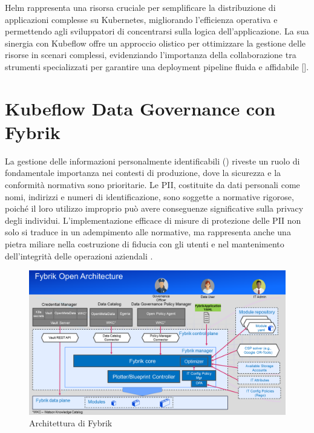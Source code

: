 Helm rappresenta una risorsa cruciale per semplificare la distribuzione di applicazioni complesse su Kubernetes, migliorando l'efficienza operativa e permettendo agli sviluppatori di concentrarsi sulla logica dell'applicazione. La sua sinergia con Kubeflow offre un approccio olistico per ottimizzare la gestione delle risorse in scenari complessi, evidenziando l'importanza della collaborazione tra strumenti specializzati per garantire una deployment pipeline fluida e affidabile [\cite{helm_kubeflow_collaboration}].

\section{Kubeflow Data Governance con Fybrik}

La gestione delle informazioni personalmente identificabili () riveste un ruolo di fondamentale importanza nei contesti di produzione, dove la sicurezza e la conformità normativa sono prioritarie. Le PII, costituite da dati personali come nomi, indirizzi e numeri di identificazione, sono soggette a normative rigorose, poiché il loro utilizzo improprio può avere conseguenze significative sulla privacy degli individui. L'implementazione efficace di misure di protezione delle PII non solo si traduce in un adempimento alle normative, ma rappresenta anche una pietra miliare nella costruzione di fiducia con gli utenti e nel mantenimento dell'integrità delle operazioni aziendali \cite{pii_importance}.

\begin{figure}[h]
    \centering
    \includegraphics[width=\linewidth]{figures/ch6/fybrik.png}
    \caption[Architettura di Fybrik]{Architettura di Fybrik}
    \label{fig:cha6:fybrik}
\end{figure}

